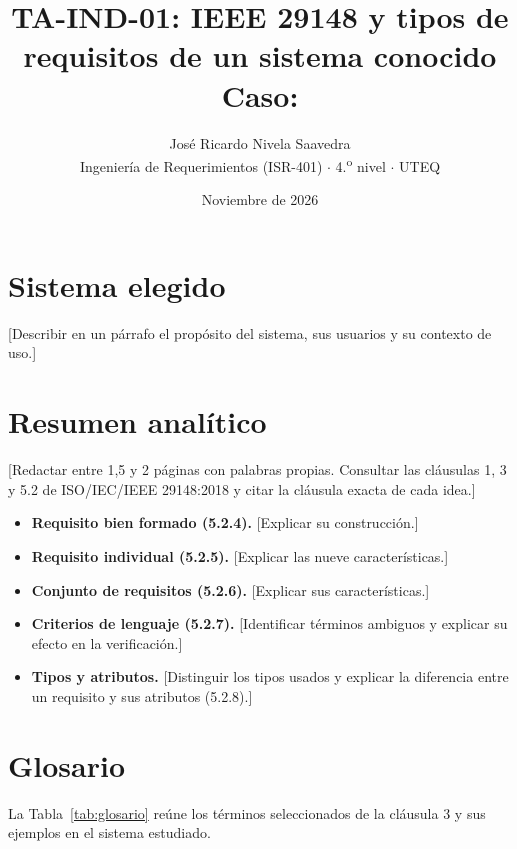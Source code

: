 \documentclass[11pt,a4paper]{article}
\title{\textbf{TA-IND-01: IEEE 29148 y tipos de requisitos de un sistema conocido}\\
  \large Caso: \campo{Nombre del sistema}}
\author{José Ricardo Nivela Saavedra\\
  \small Ingeniería de Requerimientos (ISR-401) $\cdot$ 4.\textsuperscript{o} nivel $\cdot$ UTEQ}
\date{Noviembre de 2026}
\newcommand{\campo}[1]{\textcolor{placeholder}{[#1]}}
\begin{document}
\maketitle

\section{Sistema elegido}

\campo{Describir en un párrafo el propósito del sistema, sus usuarios y su contexto de uso.}

\section{Resumen analítico}

\campo{Redactar entre 1,5 y 2 páginas con palabras propias. Consultar las cláusulas 1, 3 y 5.2 de ISO/IEC/IEEE 29148:2018 y citar la cláusula exacta de cada idea.}

\begin{itemize}
  \setlength{\itemsep}{2pt}
  \setlength{\parskip}{0pt}
  \item \textbf{Requisito bien formado (5.2.4).} \campo{Explicar su construcción.}
  \item \textbf{Requisito individual (5.2.5).} \campo{Explicar las nueve características.}
  \item \textbf{Conjunto de requisitos (5.2.6).} \campo{Explicar sus características.}
  \item \textbf{Criterios de lenguaje (5.2.7).} \campo{Identificar términos ambiguos y explicar su efecto en la verificación.}
  \item \textbf{Tipos y atributos.} \campo{Distinguir los tipos usados y explicar la diferencia entre un requisito y sus atributos (5.2.8).}
\end{itemize}

\clearpage
\section{Glosario}

La Tabla~\ref{tab:glosario} reúne los términos seleccionados de la cláusula 3 y sus ejemplos en el sistema estudiado.
\end{document}
